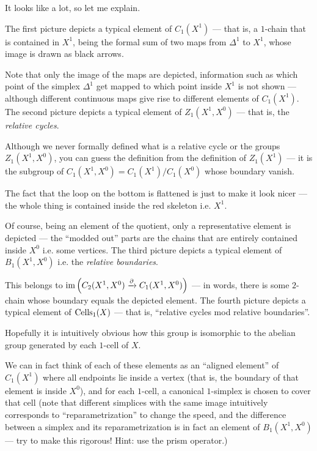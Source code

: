 It looks like a lot, so let me explain.
\begin{itemize}
	\ii The first picture depicts a typical element of $C_1(X^1)$ --- that is, a $1$-chain that is
	contained in $X^1$, being the formal sum of two
	maps from $\Delta^1$ to $X^1$, whose image is drawn as black arrows.

	Note that only the image of the maps are depicted, information such as which point of the
	simplex $\Delta^1$ get mapped to which point inside $X^1$ is not shown --- although different
	continuous maps give rise to different elements of $C_1(X^1)$.
	\ii The second picture depicts a typical element of $Z_1(X^1, X^0)$ --- that is, the
	\emph{relative cycles}.

	Although we never formally defined what is a relative cycle or the groups $Z_1(X^1, X^0)$, you
	can guess the definition from the definition of $Z_1(X^1)$ --- it is the subgroup of
	$C_1(X^1, X^0) = C_1(X^1)/C_1(X^0)$ whose boundary vanish.

	The fact that the loop on the bottom is flattened is just to make it look nicer --- the whole
	thing is contained inside the red skeleton i.e. $X^1$.

	Of course, being an element of the quotient, only a representative element is depicted ---
	the ``modded out'' parts are the chains that are entirely contained inside $X^0$ i.e. some
	vertices.
	\ii The third picture depicts a typical element of $B_1(X^1, X^0)$ i.e. the \emph{relative
	boundaries}.

	This belongs to $\operatorname{im} \left( C_2(X^1, X^0) \xrightarrow{\partial} C_1(X^1, X^0) \right)$ --- in words,
	there is some $2$-chain whose boundary equals the depicted element.
	\ii The fourth picture depicts a typical element of $\operatorname{Cells}_1(X)$ --- that is, ``relative cycles
	mod relative boundaries''.

	Hopefully it is intuitively obvious how this group is isomorphic to the abelian group generated
	by each $1$-cell of $X$.

	We can in fact think of each of these elements as an ``aligned element'' of $C_1(X^1)$
	where all endpoints lie inside a vertex (that is, the boundary of that element is inside $X^0$),
	and for each $1$-cell, a canonical $1$-simplex is chosen to cover that cell (note that different
	simplices with the same image intuitively corresponds to ``reparametrization'' to change the
	speed, and the difference between a simplex and its reparametrization is in fact
	an element of $B_1(X^1, X^0)$ --- try to make this rigorous! Hint: use the prism operator.)


\end{itemize}
